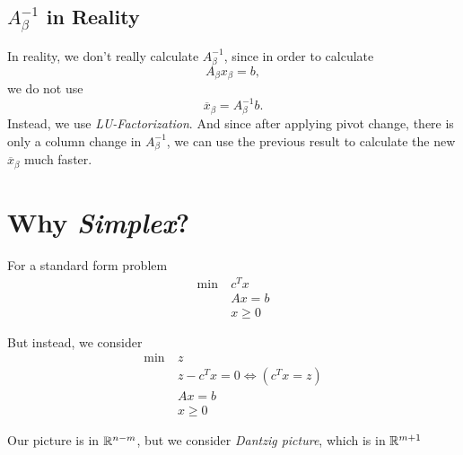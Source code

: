 \subsection{\(A_{\beta}^{-1}\) in Reality}
\begin{note}
	In reality, we don't really calculate \(A^{-1}_{\beta}\), since in order to calculate
	\[
		A_{\beta}x_{\beta} = b,
	\]
	we do not use
	\[
		\overline{x}_{\beta} = A^{-1}_{\beta}b.
	\]
	Instead, we use \emph{LU-Factorization}. And since after applying pivot change,
	there is only a column change in \(A^{-1}_{\beta}\), we can use the previous result
	to calculate the new \(\overline{x}_{\beta}\) much faster.
\end{note}

\section{Why \emph{Simplex}?}
For a standard form problem
\begin{align*}
	\min~ & c^Tx    \\
	      & Ax = b  \\
	      & x\geq 0
\end{align*}

But instead, we consider
\begin{align*}
	\min~ & z                                  \\
	      & z - c^{T} x = 0 \iff (c^{T} x = z) \\
	      & Ax = b                             \\
	      & x\geq 0
\end{align*}

\begin{prev}
	Our picture is in \(\mathbb{\MakeUppercase{R}}^{n-m}\), but we consider \emph{Dantzig picture}, which is in \(\mathbb{\MakeUppercase{R}}^{m+1}\)
\end{prev}

